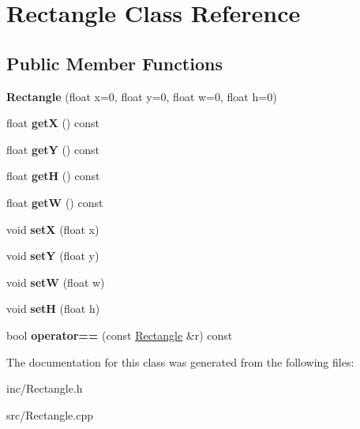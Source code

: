 \hypertarget{class_rectangle}{}\section{Rectangle Class Reference}
\label{class_rectangle}
\subsection*{Public Member Functions}
\begin{DoxyCompactItemize}
\item 
\mbox{\label{class_rectangle_a9883cae6975ba0112f377bbb7abce793}} 
{\bfseries Rectangle} (float x=0, float y=0, float w=0, float h=0)
\item 
\mbox{\label{class_rectangle_a9f8eecbc721804c48f19f39088063bc1}} 
float {\bfseries getX} () const
\item 
\mbox{\label{class_rectangle_ad80540679fb018289f95910ed9ed8f80}} 
float {\bfseries getY} () const
\item 
\mbox{\label{class_rectangle_adab9ce9b20826cf9d251f45d403ed07f}} 
float {\bfseries getH} () const
\item 
\mbox{\label{class_rectangle_ace7c59d089a88f12c804e4400a92f38b}} 
float {\bfseries getW} () const
\item 
\mbox{\label{class_rectangle_a3fa0036ff576f4b63ab3350bd229915f}} 
void {\bfseries setX} (float x)
\item 
\mbox{\label{class_rectangle_a608196906d5031c48c28554f36d7c1eb}} 
void {\bfseries setY} (float y)
\item 
\mbox{\label{class_rectangle_a81b138e164528a316c446c1ecb6aee68}} 
void {\bfseries setW} (float w)
\item 
\mbox{\label{class_rectangle_af8aa25311541024212fa0cf4d79c3ed6}} 
void {\bfseries setH} (float h)
\item 
\mbox{\label{class_rectangle_afdd1ecbbdeb075c5b927371b50fabde3}} 
bool {\bfseries operator==} (const \hyperlink{class_rectangle}{Rectangle} \&r) const
\end{DoxyCompactItemize}


The documentation for this class was generated from the following files\+:\begin{DoxyCompactItemize}
\item 
inc/Rectangle.\+h\item 
src/Rectangle.\+cpp\end{DoxyCompactItemize}
